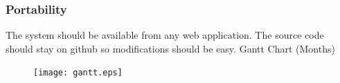 \documentclass[onecolumn, draftclsnofoot,10pt, compsoc]{IEEEtran}
\begin{document}
    \subsubsection{Portability}
    The system should be available from any web application. The source code should stay on github so modifications should be easy.
    Gantt Chart (Months)\\ 
    \begin{figure}[H]
        \centering
        \texttt{[image: gantt.eps]}
    \end{figure}

    
    
\end{document}
